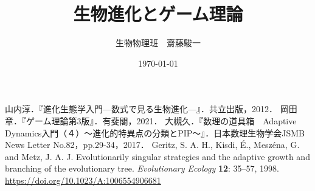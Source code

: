\documentclass[a4paper,11pt]{jsarticle}
\theoremstyle{definition}
\begin{document}
\title{生物進化とゲーム理論}
\author{生物物理班　齋藤駿一}
\date{\today}
\maketitle

\tableofcontents









\begin{thebibliography}{99}
   山内淳．『進化生態学入門---数式で見る生物進化---』．共立出版，2012．
   岡田章．『ゲーム理論第3版』．有斐閣，2021．
   大槻久．『数理の道具箱　Adaptive Dynamics入門（４）～進化的特異点の分類とPIP～』．日本数理生物学会JSMB News Letter No.82，pp.29-34，2017．
   Geritz, S. A. H., Kisdi, \'E., Mesz\'ena, G. and Metz, J. A. J. Evolutionarily singular strategies and the adaptive growth and branching of the evolutionary tree. \textit{Evolutionary Ecology} \textbf{12}: 35–57, 1998. \\
  \url{https://doi.org/10.1023/A:1006554906681}
\end{thebibliography}
\end{document}
